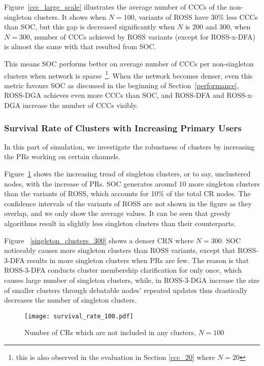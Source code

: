 Figure~\ref{ccc_large_scale} illustrates the average number of CCCs of the non-singleton clusters.
It shows when $N=100$, variants of ROSS have 30\% less CCCs than SOC, but this gap is decreased significantly when $N$ is 200 and 300, \ie when $N=300$, number of CCCs achieved by ROSS variants (except for ROSS-x-DFA) is almost the same with that resulted from SOC.

This means SOC performs better on average number of CCCs per non-singleton clusters when network is sparse~\footnote{this is also observed in the evaluation in Section \ref{ccc_20} where $N=20$}.
When the network becomes denser, even this metric favours SOC as discussed in the beginning of Section~\ref{performance}, ROSS-DGA achieves even more CCCs than SOC, and ROSS-DFA and ROSS-x-DGA increase the number of CCCs visibly.




\subsubsection{Survival Rate of Clusters with Increasing Primary Users}

In this part of simulation, we investigate the robustness of clusters by increasing the PRs working on certain channels.
 
Figure~\ref{singleton_clusters_100} shows the increasing tread of singleton clusters, or to say, unclustered nodes, with the increase of PRs.
SOC generates around 10 more singleton clusters than the variants of ROSS, which accounts for 10\% of the total CR nodes.
The confidence intervals of the variants of ROSS are not shown in the figure as they overlap, and we only show the average values.
It can be seen that greedy algorithms result in slightly less singleton clusters than their counterparts.

Figure ~\ref{singleton_clusters_300} shows a denser CRN where $N=300$.
SOC noticeably causes more singleton clusters than ROSS variants, except that ROSS-3-DFA results in more singleton clusters when PRs are few.
The reason is that ROSS-3-DFA conducts cluster membership clarification for only once, which causes large number of singleton clusters, while, in ROSS-3-DGA increase the size of smaller clusters through debatable nodes' repeated updates thus drastically decreases the number of singleton clusters.

\begin{figure}[!h]
  \centering
  \texttt{[image: survival\_rate\_100.pdf]}
  \caption{Number of CRs which are not included in any clusters, $N=100$}
  \label{singleton_clusters_100}
\end{figure}
  
